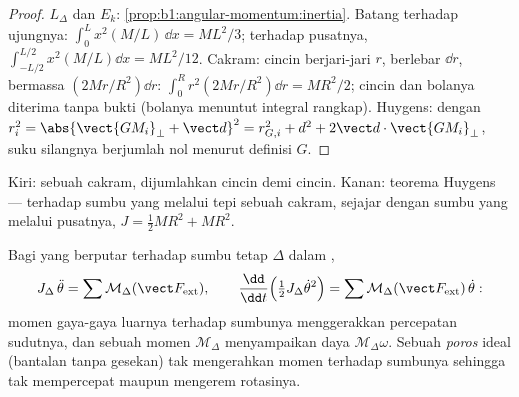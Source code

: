 \begin{proof}
$L_\Delta$ dan $E_k$: \cref{prop:b1:angular-momentum:inertia}. Batang terhadap
ujungnya: $\int_0^L x^2(M/L)\,\dd x = ML^2/3$; terhadap pusatnya, $\int_{-L/2}^{L/2}
x^2(M/L)\dd x = ML^2/12$. Cakram: cincin berjari-jari $r$, berlebar $\dd r$, bermassa
$(2Mr/R^2)\dd r$: $\int_0^R r^2(2Mr/R^2)\dd r = MR^2/2$; cincin dan
bolanya diterima tanpa bukti (bolanya menuntut integral rangkap). Huygens: dengan
$r_i^2 = \abs{\vect{GM_i}_\perp + \vect d}^2 = r_{G,i}^2 + d^2 + 2\vect d\cdot
\vect{GM_i}_\perp$, suku silangnya berjumlah nol menurut definisi $G$.
\end{proof}

\begin{omfigure}

{\small Kiri:  sebuah cakram, dijumlahkan cincin demi cincin. Kanan:
teorema Huygens --- terhadap sumbu yang melalui tepi sebuah cakram, sejajar
dengan sumbu yang melalui pusatnya, $J = \tfrac12 MR^2 + MR^2$.}
\end{omfigure}

\begin{theorem}\label{thm:b1:systems-of-points:rotation}
Bagi  yang berputar terhadap sumbu tetap $\Delta$ dalam ,
\[
J_\Delta\,\ddot\theta = \sum\mathcal M_\Delta(\vect F_{\mathrm{ext}}),
\qquad
\frac{\dd}{\dd t}\Big(\tfrac12 J_\Delta\dot\theta^2\Big) = \sum\mathcal M_\Delta(\vect F_{\mathrm{ext}})\,\dot\theta :
\]
momen gaya-gaya luarnya terhadap sumbunya menggerakkan percepatan
sudutnya, dan sebuah momen $\mathcal M_\Delta$ menyampaikan daya
$\mathcal M_\Delta\omega$. Sebuah \emph{poros} ideal (bantalan tanpa gesekan) tak
mengerahkan momen terhadap sumbunya sehingga tak mempercepat maupun mengerem
rotasinya.
\end{theorem}

